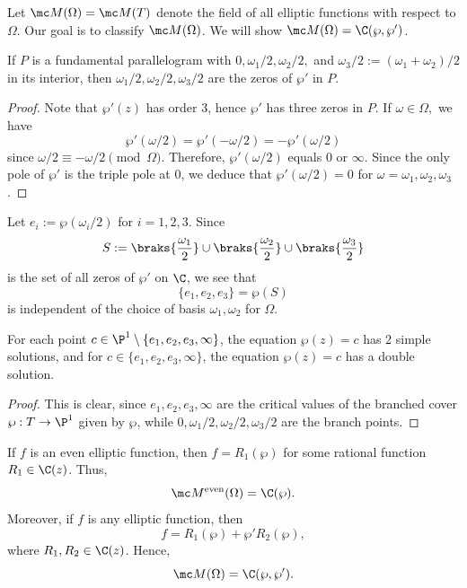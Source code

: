 \documentclass[11pt]{report}
\begin{document}
Let $\mc M(\Omega) = \mc M(T)$ denote the field of all elliptic functions with respect to $\Omega$. Our goal is to classify $\mc M(\Omega)$. We will show $\mc M(\Omega) =\C (\wp, \wp')$.

\begin{thm}
    If $P$ is a fundamental parallelogram with $0,\omega_1/2,\omega_2/2,$ and $\omega_3/2:=(\omega_1+\omega_2)/2$ in its interior, then
    $\omega_1/2,\omega_2/2,\omega_3/2$ are the zeros of $\wp'$ in $P$.
\end{thm}

\begin{proof}
    Note that $\wp'(z)$ has order $3$, hence $\wp'$ has three zeros in $P$. If $\omega \in \Omega,$ we have
    $$\wp '(\omega/2) = \wp'(-\omega/2) = -\wp'(\omega/2)$$
    since $\omega/2 \equiv -\omega/2 \pmod \Omega$. Therefore, $\wp'(\omega/2)$ equals $0$ or $\infty$. Since the only pole of $\wp'$ is the triple pole at $0$, we deduce that $\wp'(\omega/2)=0$ for $\omega =\omega_1,\omega_2,\omega_3$.
\end{proof}


\begin{rmk}
  Let $e_i := \wp (\omega_i/2)$ for $i=1,2,3$. Since 
  $$S := \braks{\frac{\omega_1}{2}} \cup \braks{\frac{\omega_2}{2}} \cup \braks{\frac{\omega_3}{2}}$$
  is the set of all zeros of $\wp'$ on $\C$, we see that
  $$\{e_1,e_2,e_3\} = \wp(S)$$
  is independent of the choice of basis $\omega_1,\omega_2$ for $\Omega$.
\end{rmk}

\begin{cor}[][label=cor:solutions_of_p]
    For each point $c \in \P^1 \setminus \{e_1,e_2,e_3,\infty\}$, the equation $\wp(z)=c$ has 2 simple solutions, and for $c \in \{e_1,e_2,e_3,\infty\}$, the equation $\wp (z) = c$ has a double solution.
\end{cor}

\begin{proof}
    This is clear, since $e_1,e_2,e_3,\infty$ are the critical values of the branched cover $\wp:T \to \P^1$ given by $\wp$, while $0,\omega_1/2,\omega_2/2,\omega_3/2$ are the branch points. 
\end{proof}

\begin{thm}
    If $f$ is an even elliptic function, then $f=R_1(\wp )$ for some rational function $R_1 \in \C(z)$. Thus,
    $$\mc M^{\text{even}}(\Omega) = \C(\wp).$$
    Moreover, if $f$ is any elliptic function, then
    $$f=R_1(\wp) + \wp' R_2(\wp),$$
    where $R_1,R_2 \in \C(z)$. Hence,
    $$\mc M(\Omega) = \C(\wp,\wp').$$
\end{thm}
\end{document}
